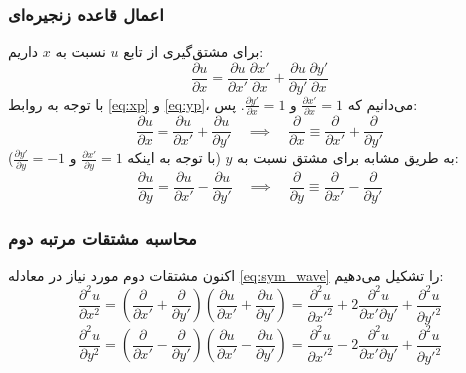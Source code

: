 \documentclass[12pt,a4paper]{article}
\begin{document}
\subsubsection*{اعمال قاعده زنجیره‌ای}
برای مشتق‌گیری از تابع $u$ نسبت به $x$ داریم:
\begin{equation}
    \frac{\partial u}{\partial x} = \frac{\partial u}{\partial x'}\frac{\partial x'}{\partial x} + \frac{\partial u}{\partial y'}\frac{\partial y'}{\partial x}
\end{equation}
با توجه به روابط \eqref{eq:xp} و \eqref{eq:yp}، می‌دانیم که $\frac{\partial x'}{\partial x} = 1$ و $\frac{\partial y'}{\partial x} = 1$. پس:
\begin{equation} \label{eq:du_dx}
    \frac{\partial u}{\partial x} = \frac{\partial u}{\partial x'} + \frac{\partial u}{\partial y'} \quad \implies \quad \frac{\partial}{\partial x} \equiv \frac{\partial}{\partial x'} + \frac{\partial}{\partial y'}
\end{equation}
به طریق مشابه برای مشتق نسبت به $y$ (با توجه به اینکه $\frac{\partial x'}{\partial y} = 1$ و $\frac{\partial y'}{\partial y} = -1$):
\begin{equation} \label{eq:du_dy}
    \frac{\partial u}{\partial y} = \frac{\partial u}{\partial x'} - \frac{\partial u}{\partial y'} \quad \implies \quad \frac{\partial}{\partial y} \equiv \frac{\partial}{\partial x'} - \frac{\partial}{\partial y'}
\end{equation}

\subsubsection*{محاسبه مشتقات مرتبه دوم}
اکنون مشتقات دوم مورد نیاز در معادله \eqref{eq:sym_wave} را تشکیل می‌دهیم:
\begin{equation}
    \frac{\partial^2 u}{\partial x^2} = \left( \frac{\partial}{\partial x'} + \frac{\partial}{\partial y'} \right) \left( \frac{\partial u}{\partial x'} + \frac{\partial u}{\partial y'} \right) = \frac{\partial^2 u}{\partial x'^2} + 2\frac{\partial^2 u}{\partial x'\partial y'} + \frac{\partial^2 u}{\partial y'^2}
\end{equation}
\begin{equation}
    \frac{\partial^2 u}{\partial y^2} = \left( \frac{\partial}{\partial x'} - \frac{\partial}{\partial y'} \right) \left( \frac{\partial u}{\partial x'} - \frac{\partial u}{\partial y'} \right) = \frac{\partial^2 u}{\partial x'^2} - 2\frac{\partial^2 u}{\partial x'\partial y'} + \frac{\partial^2 u}{\partial y'^2}
\end{equation}
\end{document}
